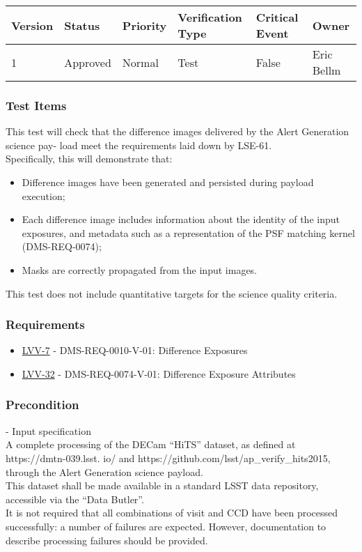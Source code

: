 \begin{longtable}[]{@{}llllll@{}}
\toprule
Version & Status & Priority & Verification Type & Critical Event &
Owner\tabularnewline
\midrule
\endhead
1 & Approved & Normal & Test & False & Eric Bellm\tabularnewline
\bottomrule
\end{longtable}

\subsubsection{Test Items}\label{test-items-3}

This test will check that the difference images delivered by the Alert
Generation science pay- load meet the requirements laid down by
LSE-61.\\
Specifically, this will demonstrate that:

\begin{itemize}
\tightlist
\item
  Difference images have been generated and persisted during payload
  execution;
\item
  Each difference image includes information about the identity of the
  input exposures, and metadata such as a representation of the PSF
  matching kernel (DMS-REQ-0074);
\item
  Masks are correctly propagated from the input images.
\end{itemize}

This test does not include quantitative targets for the science quality
criteria.

\subsubsection{Requirements}\label{requirements-3}

\begin{itemize}
\tightlist
\item
  \href{https://jira.lsstcorp.org/browse/LVV-7}{LVV-7} -
  DMS-REQ-0010-V-01: Difference Exposures
\item
  \href{https://jira.lsstcorp.org/browse/LVV-32}{LVV-32} -
  DMS-REQ-0074-V-01: Difference Exposure Attributes
\end{itemize}

\subsubsection{Precondition}\label{precondition-3}

- Input specification\\[2\baselineskip]A complete processing of the
DECam ``HiTS'' dataset, as defined at https://dmtn-039.lsst. io/ and
https://github.com/lsst/ap\_verify\_hits2015, through the Alert
Generation science payload.\\
This dataset shall be made available in a standard LSST data repository,
accessible via the ``Data Butler''.\\
It is not required that all combinations of visit and CCD have been
processed successfully: a number of failures are expected. However,
documentation to describe processing failures should be provided.

